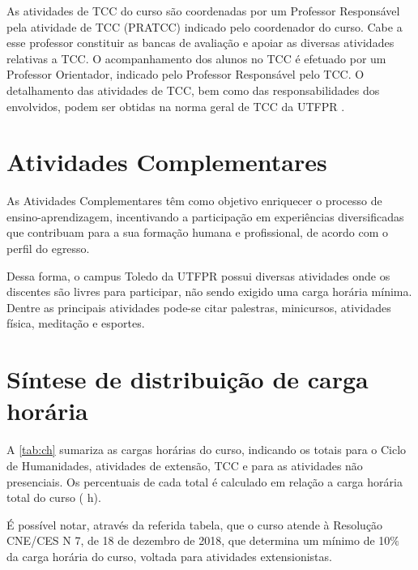 As atividades de TCC do curso são coordenadas por um Professor Responsável pela atividade de TCC (PRATCC) indicado pelo coordenador do curso. Cabe a esse professor constituir as bancas de avaliação e apoiar as diversas atividades relativas a TCC. O acompanhamento dos alunos no TCC é efetuado por um Professor Orientador, indicado pelo Professor Responsável pelo TCC. O detalhamento das atividades de TCC, bem como das responsabilidades dos envolvidos, podem ser obtidas na norma geral de TCC da UTFPR \cite{cogep18}.

\section{Atividades Complementares}

As Atividades Complementares têm como objetivo enriquecer o processo de ensino-aprendizagem, incentivando a participação em experiências diversificadas que contribuam para a sua formação humana e profissional, de acordo com o perfil do egresso.

Dessa forma, o campus Toledo da UTFPR possui diversas atividades onde os discentes são livres para participar, não sendo exigido uma carga horária mínima. Dentre as principais atividades pode-se citar palestras, minicursos, atividades física, meditação e esportes.

\section{Síntese de distribuição de carga horária}

A \autoref{tab:ch} sumariza as cargas horárias do curso, indicando os totais para o Ciclo de Humanidades, atividades de extensão, TCC e para as atividades não presenciais. Os percentuais de cada total é calculado em relação a carga horária total do curso (\the\value{horasT} h).

É possível notar, através da referida tabela, que o curso atende à Resolução CNE/CES N\textordmasculine{} 7, de 18 de dezembro de 2018, que determina um mínimo de 10$\%$ da carga horária do curso, voltada para atividades extensionistas.

